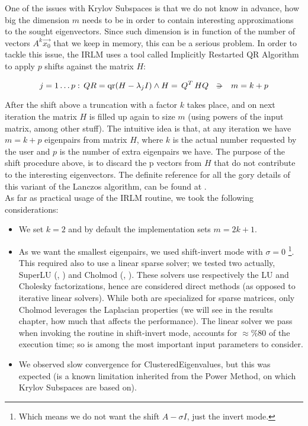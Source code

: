 One of the issues with Krylov Subspaces is that we do not know in
advance, how big the dimension $m$ needs to be in order to contain
interesting approximations to the sought eigenvectors. Since such
dimension is in function of the number of vectors $A^k \vec{x_0}$ that
we keep in memory, this can be a serious problem. In order to tackle
this issue, the \gls{IRLM} uses a tool called Implicitly Restarted QR
Algorithm to apply $p$ shifts against the matrix $H$:

\begin{equation*}
    j=1 \ldots p:\, QR = \func{qr}(H - \lambda_j I) \land H = \trans{Q}HQ
    \ds{\suchthat}
    m = k + p
\end{equation*}
\joinbelow{1cm}

After the shift above a truncation with a factor $k$ takes place, and on
next iteration the matrix $H$ is filled up again to size $m$ (using
powers of the input matrix, among other stuff). The intuitive idea is that,
at any iteration we have $m = k + p$ eigenpairs from matrix $H$, where
$k$ is the actual number requested by the user and $p$ is the number
of extra eigenpairs we have. The purpose of the shift procedure above, is to 
discard the p vectors from $H$ that do not contribute to the
interesting eigenvectors. The definite reference for all the gory
details of this variant of the Lanczos algorithm, can be found at
\cite{arpack}. \\

As far as practical usage of the \gls{IRLM} routine, we took the following
considerations:

\begin{itemize}
\item We set $k=2$ and by default the implementation sets $m=2k+1$.
\item As we want the smallest eigenpairs, we used shift-invert mode
  with $\sigma=0$ \footnote{Which means we 
  do not want the shift $A - \sigma I$, just the invert mode.}. This
  required also to use a linear sparse solver; we tested two actually, \gls{SuperLU}
  (\cite{superlu97}, \cite{superlu05}) and  \gls{Cholmod} (\cite{cholmod08},
  \cite{cholmod08a}). These solvers use respectively the LU and
  Cholesky factorizations, hence are considered direct
  methods (as opposed to iterative linear solvers). While
  both are specialized for sparse matrices, only \gls{Cholmod} leverages
  the \gls{Laplacian} properties (we will see in the results chapter, how much
  that affects the performance). The linear solver we pass when invoking the
  routine in shift-invert mode, accounts for $\approx \%80$ of
  the execution time; so is among the most important input parameters
  to consider. 
\item We observed slow convergence for \gls{ClusteredEigenvalues}, but this
  was expected (is a known limitation inherited from the Power
  Method, on which Krylov Subspaces are based on).
\end{itemize}

